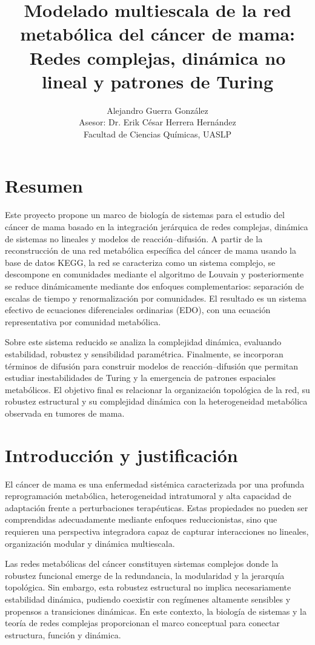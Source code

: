 \documentclass[12pt,spanish]{article}
\title{\textbf{Modelado multiescala de la red metabólica del cáncer de mama:}\\
	Redes complejas, dinámica no lineal y patrones de Turing}
\author{Alejandro Guerra González\\
	Asesor: Dr. Erik César Herrera Hernández\\
	Facultad de Ciencias Químicas, UASLP}
\date{}
\begin{document}
	\maketitle
	
	\section{Resumen}
	
	Este proyecto propone un marco de biología de sistemas para el estudio del cáncer de mama basado en la integración jerárquica de redes complejas, dinámica de sistemas no lineales y modelos de reacción--difusión. A partir de la reconstrucción de una red metabólica específica del cáncer de mama usando la base de datos KEGG, la red se caracteriza como un sistema complejo, se descompone en comunidades mediante el algoritmo de Louvain y posteriormente se reduce dinámicamente mediante dos enfoques complementarios: separación de escalas de tiempo y renormalización por comunidades. El resultado es un sistema efectivo de ecuaciones diferenciales ordinarias (EDO), con una ecuación representativa por comunidad metabólica.
	
	Sobre este sistema reducido se analiza la complejidad dinámica, evaluando estabilidad, robustez y sensibilidad paramétrica. Finalmente, se incorporan términos de difusión para construir modelos de reacción--difusión que permitan estudiar inestabilidades de Turing y la emergencia de patrones espaciales metabólicos. El objetivo final es relacionar la organización topológica de la red, su robustez estructural y su complejidad dinámica con la heterogeneidad metabólica observada en tumores de mama.
	
	\section{Introducción y justificación}
	
	El cáncer de mama es una enfermedad sistémica caracterizada por una profunda reprogramación metabólica, heterogeneidad intratumoral y alta capacidad de adaptación frente a perturbaciones terapéuticas. Estas propiedades no pueden ser comprendidas adecuadamente mediante enfoques reduccionistas, sino que requieren una perspectiva integradora capaz de capturar interacciones no lineales, organización modular y dinámica multiescala.
	
	Las redes metabólicas del cáncer constituyen sistemas complejos donde la robustez funcional emerge de la redundancia, la modularidad y la jerarquía topológica. Sin embargo, esta robustez estructural no implica necesariamente estabilidad dinámica, pudiendo coexistir con regímenes altamente sensibles y propensos a transiciones dinámicas. En este contexto, la biología de sistemas y la teoría de redes complejas proporcionan el marco conceptual para conectar estructura, función y dinámica.
	
\end{document}
